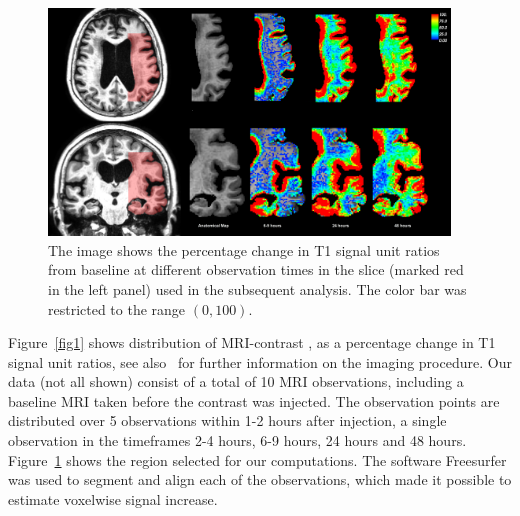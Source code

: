 \documentclass[12pt,a4paper]{article}
\begin{document}
\begin{figure}
\includegraphics[width=0.95\textwidth]{../Zoom-PatID.png} 
\caption{The image shows the percentage change in T1 signal unit ratios from baseline at different observation times in the slice (marked red in the left panel) used in the subsequent analysis. The color bar was restricted to the range $(0,100)$. }
\label{fig2} 
\end{figure}
Figure~\ref{fig1} shows distribution of MRI-contrast%
, as a percentage change in T1 signal unit ratios, see also~\cite{ringstad2018brain} for further information on the imaging procedure.   
Our data (not all shown) consist of a total of 10 MRI observations, including a baseline MRI taken before the contrast was injected. The observation points are distributed over 5 observations within 1-2 hours after injection, a single observation in the timeframes 2-4 hours, 6-9 hours, 24 hours and 48 hours. 
Figure~\ref{fig2} shows the region selected for our computations. 
The software Freesurfer \cite{Dale1999179, FischlLiuDale, spf2007, reuter:robreg10} was used to segment and align each of the observations, which made it possible to estimate voxelwise signal increase. 

\end{document}
